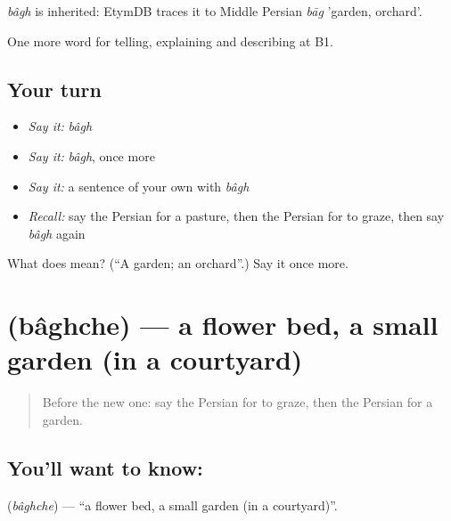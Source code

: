 \begin{cousinweb}
\emph{bâgh} is inherited: EtymDB traces it to Middle Persian \emph{bāg} 'garden, orchard'.
\end{cousinweb}

\begin{grammarlens}[title={What you've built}]
One more word for telling, explaining and describing at B1.
\end{grammarlens}

\subsection*{Your turn}
\begin{itemize}
\raggedright
  \item \emph{Say it:} \emph{bâgh}
  \item \emph{Say it:} \emph{bâgh}, once more
  \item \emph{Say it:} a sentence of your own with \emph{bâgh}
  \item \emph{Recall:} say the Persian for a pasture, then the Persian for to graze, then say \emph{bâgh} again
\end{itemize}

\begin{tcolorbox}[breakable,colback=teal!4,colframe=teal!35!black,title={Before you move on}]
What does  mean? (\textquotedblleft{}A garden; an orchard\textquotedblright{}.) Say it once more.
\end{tcolorbox}
\section[\texorpdfstring{\fa{باغچه} (bâghche)}{باغچه (bâghche)}]{ (bâghche) — a flower bed, a small garden (in a courtyard)}

\label{lesson:FA-C467-baghche}



\begin{quote}
Before the new one: say the Persian for to graze, then the Persian for a garden.
\end{quote}

\subsection*{You'll want to know: }
\textbf{} (\emph{bâghche}) — \textquotedblleft{}a flower bed, a small garden (in a courtyard)\textquotedblright{}.

